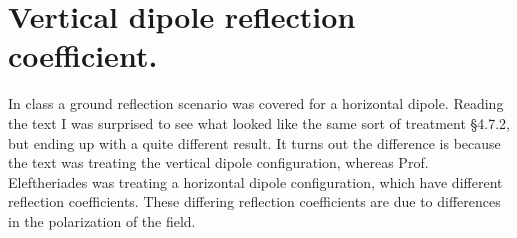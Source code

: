 %
%
\section{Vertical dipole reflection coefficient.}
%
In class a ground reflection scenario was covered for a horizontal dipole.  Reading the text I was surprised to see what looked like the same sort of treatment \S 4.7.2, but ending up with a quite different result.  It turns out the difference is because the text was treating the vertical dipole configuration, whereas Prof. Eleftheriades was treating a horizontal dipole configuration, which have different reflection coefficients.  These differing reflection coefficients are due to differences in the polarization of the field.


